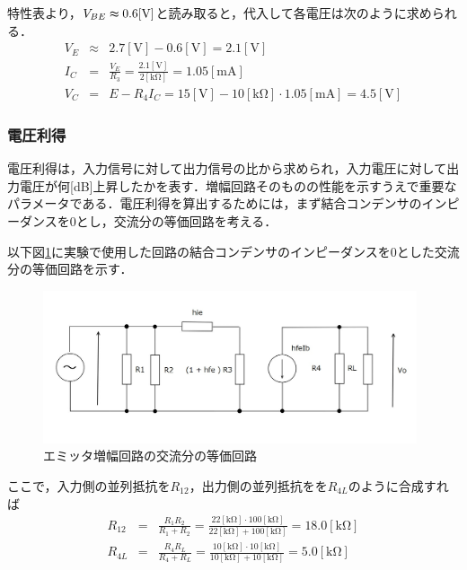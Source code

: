 \documentclass[dvipdfmx,titlepage,a4j]{jsarticle}  %
\numberwithin{equation}{section}
\begin{document}
特性表より，$V_{BE}\thickapprox 0.6 \mathrm{[V]}$と読み取ると，代入して各電圧は次のように求められる．
\begin{eqnarray}
  V_E &\approx& 2.7\mathrm{[V]} - 0.6\mathrm{[V]} = 2.1\mathrm{[V]}\\
  \label{eq:I_C}
  I_C &=& \frac{V_E}{R_3} = \frac{2.1\mathrm{[V]}}{2\mathrm{[k\Omega]}} = 1.05\mathrm{[mA]}\\
  V_C &=& E - R_4 I_C = 15\mathrm{[V]} - 10\mathrm{[k\Omega]} \cdot 1.05\mathrm{[mA]} = 4.5\mathrm{[V]}
\end{eqnarray}

\subsubsection{電圧利得}
電圧利得は，入力信号に対して出力信号の比から求められ，入力電圧に対して出力電圧が何[dB]上昇したかを表す．増幅回路そのものの性能を示すうえで重要な
パラメータである．電圧利得を算出するためには，まず結合コンデンサのインピーダンスを0とし，交流分の等価回路を考える．

以下図\ref{fig:fig3-touka.jpg}に実験で使用した回路の結合コンデンサのインピーダンスを0とした交流分の等価回路を示す．

\begin{figure}[H]
  \centering
  \includegraphics[width=11cm]{../fig/fig3-touka.jpg}
  \caption{エミッタ増幅回路の交流分の等価回路}
  \label{fig:fig3-touka.jpg}
\end{figure}

ここで，入力側の並列抵抗を$R_{12}$，出力側の並列抵抗をを$R_{4L}$のように合成すれば
\begin{eqnarray}
  R_{12} &=& \frac{R_1 R_2}{R_1 + R_2} = \frac{22\mathrm{[k\Omega]} \cdot 100\mathrm{[k\Omega]}}{22\mathrm{[k\Omega]} + 100\mathrm{[k\Omega]}} = 18.0\mathrm{[k\Omega]} \\
  R_{4L} &=& \frac{R_4 R_L}{R_4 + R_L}= \frac{10\mathrm{[k\Omega]} \cdot 10\mathrm{[k\Omega]}}{10\mathrm{[k\Omega]} + 10\mathrm{[k\Omega]}} = 5.0\mathrm{[k\Omega]}
\end{eqnarray}
\end{document}
